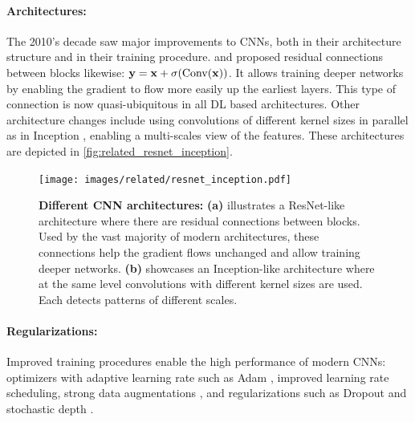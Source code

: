 \paragraph{Architectures:}The 2010's decade saw major improvements to \acp{CNN}, both in their
architecture structure and in their training procedure. \cite{srivastava2015highwaynet} and
\cite{he2016resnet} proposed residual connections between blocks likewise: $\mathbf{y} = \mathbf{x} +
      \sigma(\operatorname{Conv}(\mathbf{x}))$. It allows training deeper networks by enabling the gradient to
flow more easily up the earliest layers. This type of connection is now quasi-ubiquitous in all
\ac{DL} based architectures. Other architecture changes include using convolutions of different
kernel sizes in parallel as in Inception \citep{szegedy2015inception}, enabling a multi-scales view
of the features. These architectures are depicted in \autoref{fig:related_resnet_inception}.

\begin{figure}[tb]
      \begin{center}
            \texttt{[image: images/related/resnet\_inception.pdf]}
      \end{center}
      \caption{\textbf{Different CNN architectures:} \textbf{(a)} illustrates a ResNet-like
            architecture where there are residual connections between blocks. Used by the vast
            majority of modern architectures, these connections help the gradient flows unchanged
            and allow training deeper networks. \textbf{(b)} showcases an Inception-like
            architecture where at the same level convolutions with different kernel sizes are used.
            Each detects patterns of different scales.}
      \label{fig:related_resnet_inception}
\end{figure}

\paragraph{Regularizations:} Improved training procedures \citep{wightman2019resnetstrikesback}
enable the high performance of modern \acp{CNN}: optimizers with adaptive learning rate such as Adam
\citep{kingma2014adam}, improved learning rate scheduling, strong data augmentations
\citep{muller2021trivialaugment,hingyi2018mixup,zhong2017erasing}, and regularizations such as
Dropout \citep{gal2016dropout} and stochastic depth \citep{gao2016stochasticdepth}.

